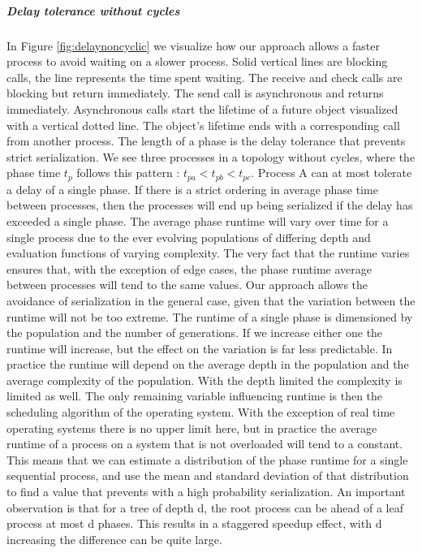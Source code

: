 \subparagraph{Delay tolerance without cycles}
In Figure \ref{fig:delaynoncyclic} we visualize how our approach allows a faster process to avoid waiting on a slower process. Solid vertical lines are blocking calls, the line represents the time spent waiting. The receive and check calls are blocking but return immediately. The send call is asynchronous and returns immediately. Asynchronous calls start the lifetime of a future object visualized with a vertical dotted line. The object's lifetime ends with a corresponding call from another process.
The length of a phase is the delay tolerance that prevents strict serialization. We see three processes in a topology without cycles, where the phase time $t_p$ follows this pattern : $t_{pa} < t_{pb} < t_{pc}$. Process A can at most tolerate a delay of a single phase. If there is a strict ordering in average phase time between processes, then the processes will end up being serialized if the delay has exceeded a single phase. The average phase runtime will vary over time for a single process due to the ever evolving populations of differing depth and evaluation functions of varying complexity. The very fact that the runtime varies ensures that, with the exception of edge cases, the phase runtime average between processes will tend to the same values. Our approach allows the avoidance of serialization in the general case, given that the variation between the runtime will not be too extreme. The runtime of a single phase is dimensioned by the population and the number of generations. If we increase either one the runtime will increase, but the effect on the variation is far less predictable. In practice the runtime will depend on the average depth in the population and the average complexity of the population. With the depth limited the complexity is limited as well. The only remaining variable influencing runtime is then the scheduling algorithm of the operating system. With the exception of real time operating systems there is no upper limit here, but in practice the average runtime of a process on a system that is not overloaded will tend to a constant. This means that we can estimate a distribution of the phase runtime for a single sequential process, and use the mean and standard deviation of that distribution to find a value that prevents with a high probability serialization. 
An important observation is that for a tree of depth d, the root process can be ahead of a leaf process at most d phases. This results in a staggered speedup effect, with d increasing the difference can be quite large.
